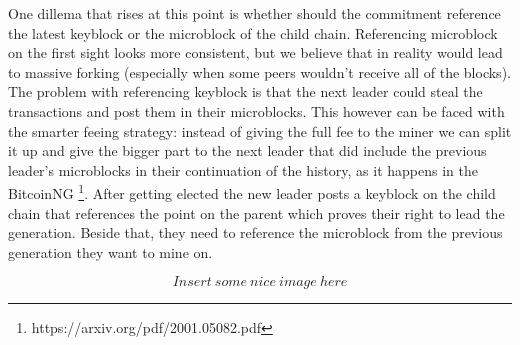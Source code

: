 One dillema that rises at this point is whether should the commitment reference
the latest keyblock or the microblock of the child chain. Referencing microblock
on the first sight looks more consistent, but we believe that in reality would
lead to massive forking (especially when some peers wouldn't receive all of the
blocks). The problem with referencing keyblock is that the next leader could
steal the transactions and post them in their microblocks. This however can be
faced with the smarter feeing strategy: instead of giving the full fee to the
miner we can split it up and give the bigger part to the next leader that did
include the previous leader's microblocks in their continuation of the history,
as it happens in the BitcoinNG
\footnote{https://arxiv.org/pdf/2001.05082.pdf}.
After getting elected the new leader posts a keyblock on the child chain that
references the point on the parent which proves their right to lead the
generation. Beside that, they need to reference the microblock from the previous
generation they want to mine on.

$$Insert\ some\ nice\ image\ here$$



